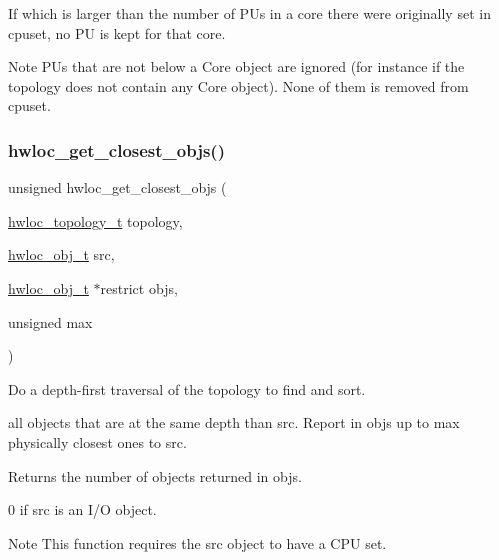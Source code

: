 If {\ttfamily which} is larger than the number of P\+Us in a core there were originally set in {\ttfamily cpuset}, no PU is kept for that core.

\begin{DoxyNote}{Note}
P\+Us that are not below a Core object are ignored (for instance if the topology does not contain any Core object). None of them is removed from {\ttfamily cpuset}. 
\end{DoxyNote}
\mbox{\label{a00200_ga2cd22a34360643f7f5bad09576dec205}} 
\subsubsection{\texorpdfstring{hwloc\+\_\+get\+\_\+closest\+\_\+objs()}{hwloc\_get\_closest\_objs()}}
{\footnotesize\ttfamily unsigned hwloc\+\_\+get\+\_\+closest\+\_\+objs (\begin{DoxyParamCaption}\item[{\hyperlink{a00186_ga9d1e76ee15a7dee158b786c30b6a6e38}{hwloc\+\_\+topology\+\_\+t}}]{topology,  }\item[{\hyperlink{a00185_ga79b8ab56877ef99ac59b833203391c7d}{hwloc\+\_\+obj\+\_\+t}}]{src,  }\item[{\hyperlink{a00185_ga79b8ab56877ef99ac59b833203391c7d}{hwloc\+\_\+obj\+\_\+t} $\ast$restrict}]{objs,  }\item[{unsigned}]{max }\end{DoxyParamCaption})}



Do a depth-\/first traversal of the topology to find and sort. 

all objects that are at the same depth than {\ttfamily src}. Report in {\ttfamily objs} up to {\ttfamily max} physically closest ones to {\ttfamily src}.

\begin{DoxyReturn}{Returns}
the number of objects returned in {\ttfamily objs}.

0 if {\ttfamily src} is an I/O object.
\end{DoxyReturn}
\begin{DoxyNote}{Note}
This function requires the {\ttfamily src} object to have a C\+PU set. 
\end{DoxyNote}
\mbox{\label{a00200_gab89d9ed9edfaa3dd526fb6ee1a1618ea}} 

